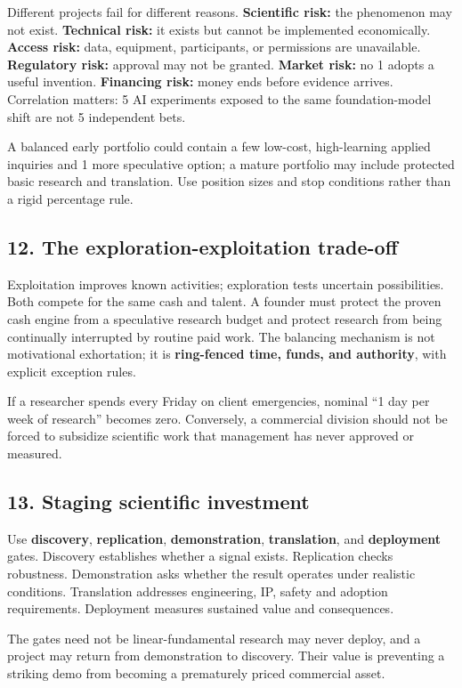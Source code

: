 Different projects fail for different reasons. \textbf{Scientific risk:} the phenomenon may not exist. \textbf{Technical risk:} it exists but cannot be implemented economically. \textbf{Access risk:} data, equipment, participants, or permissions are unavailable. \textbf{Regulatory risk:} approval may not be granted. \textbf{Market risk:} no 1 adopts a useful invention. \textbf{Financing risk:} money ends before evidence arrives. Correlation matters: 5 AI experiments exposed to the same foundation-model shift are not 5 independent bets.

A balanced early portfolio could contain a few low-cost, high-learning applied inquiries and 1 more speculative option; a mature portfolio may include protected basic research and translation. Use position sizes and stop conditions rather than a rigid percentage rule.

\subsection{12. The exploration-exploitation trade-off}

Exploitation improves known activities; exploration tests uncertain possibilities. Both compete for the same cash and talent. A founder must protect the proven cash engine from a speculative research budget and protect research from being continually interrupted by routine paid work. The balancing mechanism is not motivational exhortation; it is \textbf{ring-fenced time, funds, and authority}, with explicit exception rules.

If a researcher spends every Friday on client emergencies, nominal ``1 day per week of research'' becomes zero. Conversely, a commercial division should not be forced to subsidize scientific work that management has never approved or measured.

\subsection{13. Staging scientific investment}

Use \textbf{discovery}, \textbf{replication}, \textbf{demonstration}, \textbf{translation}, and \textbf{deployment} gates. Discovery establishes whether a signal exists. Replication checks robustness. Demonstration asks whether the result operates under realistic conditions. Translation addresses engineering, IP, safety and adoption requirements. Deployment measures sustained value and consequences.

The gates need not be linear-fundamental research may never deploy, and a project may return from demonstration to discovery. Their value is preventing a striking demo from becoming a prematurely priced commercial asset.

